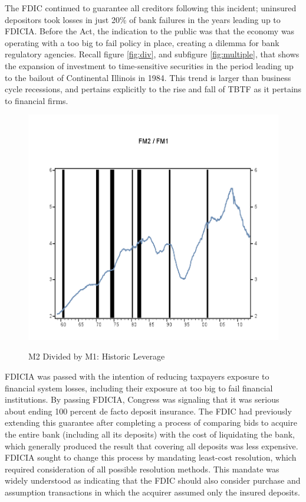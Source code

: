 The FDIC continued to guarantee all creditors following this incident; uninsured depositors took losses in just 20\% of bank failures in the years leading up to FDICIA.\cite{Peterson} Before the Act, the indication to the public was that the economy was operating with a too big to fail policy in place, creating a dilemma for bank regulatory agencies.  Recall figure \ref{fig:div}, and subfigure \ref{fig:multiple}, that shows the expansion of investment to time-sensitive securities in the period leading up to the bailout of Continental Illinois in 1984.  This trend is larger than business cycle recessions, and pertains explicitly to the rise and fall of TBTF as it pertains to financial firms.

\begin{figure}[H]
\centering
\includegraphics[scale=.70]{figure/HistoricalFM.png}\\[-0.7cm]
\caption*{M2 Divided by M1: Historic Leverage \label{no1}}
\end{figure}

FDICIA was passed with the intention of reducing taxpayers exposure to financial system losses, including their exposure at too big to fail financial institutions. By passing FDICIA, Congress was signaling that it was serious about ending 100 percent de facto deposit insurance.\cite{Wall} The FDIC had previously extending this guarantee after completing a process of comparing bids to acquire the entire bank (including all its deposits) with the cost of liquidating the bank, which generally produced the result that covering all deposits was less expensive. FDICIA sought to change this process by mandating least-cost resolution, which required consideration of all possible resolution methods. This mandate was widely understood as indicating that the FDIC should also consider purchase and assumption transactions in which the acquirer assumed only the insured deposits.

